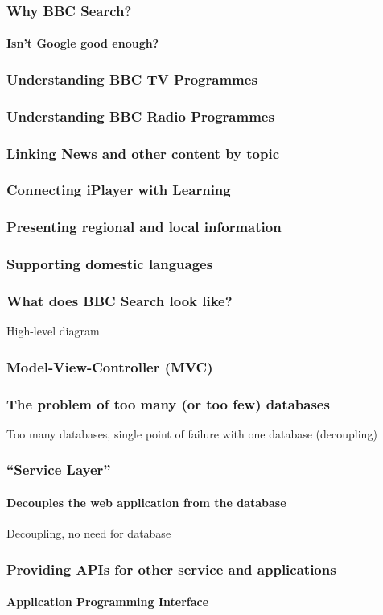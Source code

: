 \documentclass{beamer}
\begin{document}
\begin{frame}
  \frametitle{Why BBC Search?}
  \framesubtitle{Isn't Google good enough?}
\end{frame}

\begin{frame}
  \frametitle{Understanding BBC TV Programmes}
\end{frame}

\begin{frame}
  \frametitle{Understanding BBC Radio Programmes}
\end{frame}

\begin{frame}
  \frametitle{Linking News and other content by topic}
\end{frame}

\begin{frame}
  \frametitle{Connecting iPlayer with Learning}
\end{frame}

\begin{frame}
  \frametitle{Presenting regional and local information}
\end{frame}

\begin{frame}
  \frametitle{Supporting domestic languages}
\end{frame}

\begin{frame}
  \frametitle{What does BBC Search look like?}
  High-level diagram
\end{frame}

\begin{frame}
  \frametitle{Model-View-Controller (MVC)}
\end{frame}

\begin{frame}
  \frametitle{The problem of too many (or too few) databases}
  Too many databases, single point of failure with one database (decoupling)
\end{frame}

\begin{frame}
  \frametitle{``Service Layer''}
  \framesubtitle{Decouples the web application from the database}
  Decoupling, no need for database
\end{frame}

\begin{frame}
  \frametitle{Providing APIs for other service and applications}
  \framesubtitle{Application Programming Interface}
\end{frame}
\end{document}
